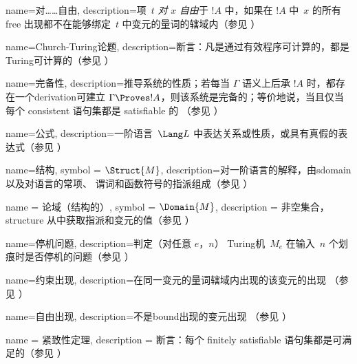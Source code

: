  {
  name=对……自由,
  description={项~$t$ \emph{对} $x$ \emph{自由}于 $!A$ 中，如果在 $!A$ 中~$x$ 的所有
    \gls{free} 出现都不在能够绑定~$t$ 中变元的量词的辖域内（参见
    ）} }

 {
  name=Church-Turing论题,
  description={断言：凡是通过有效程序可计算的，都是 Turing可计算的（参见 ）} }

 {
  name=完备性,
  description={推导系统的性质；若每当
    $\Gamma$ 语义上后承 $!A$ 时，都存在一个\gls{derivation}可建立 $\Gamma \Proves !A$，则该系统是完备的；等价地说，当且仅当
    每个 \gls{consistent} 语句集都是 \gls{satisfiable} 的
    （参见 ）} }

 {
  name={公式},
  description={一阶语言~$\Lang L$ 中表达关系或性质，或具有真假的表达式（参见
    ）} }

 {
  name={结构},
  symbol = {\ensuremath{\Struct{M}}},
  description={对一阶语言的解释，由\gls{sdomain}以及对语言的常项、
    谓词和函数符号的指派组成（参见
    ）} }

 {
  name = {论域（结构的）},
  symbol = {\ensuremath{\Domain{M}}},
  description = {非空集合，\gls{structure} 从中获取指派和变元的值（参见
    ）} }

 {
  name=停机问题,
  description={判定（对任意 $e$，$n$） Turing机~$M_e$ 在输入~$n$ 个划痕时是否停机的问题（参见
    ）} }

 {
  name=约束出现,
  description={在同一变元的量词辖域内出现的该变元的出现
    （参见 ）}
}

 {
  name=自由出现,
    description={不是\gls{bound}出现的变元出现
    （参见 ）}
}

 {
  name = {紧致性定理},
  description = {断言：每个 \gls{finitely satisfiable} 语句集都是可满足的（参见
    ）}}




